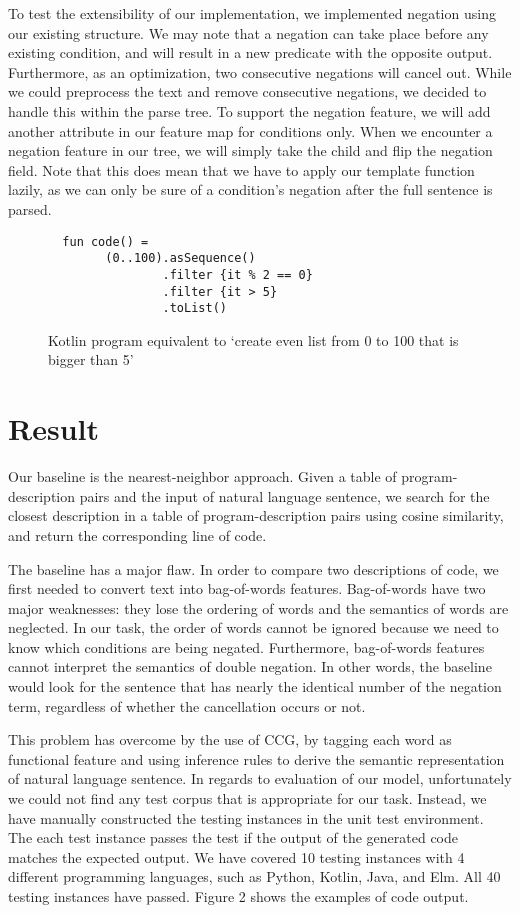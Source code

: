 \documentclass[11pt,letterpaper]{article}
\begin{document}
To test the extensibility of our implementation, we implemented negation using our existing structure.
We may note that a negation can take place before any existing condition, and will result in a new predicate with the opposite output.
Furthermore, as an optimization, two consecutive negations will cancel out. 
While we could preprocess the text and remove consecutive negations, we decided to handle this within the parse tree.
To support the negation feature, we will add another attribute in our feature map for conditions only.
When we encounter a negation feature in our tree, we will simply take the child and flip the negation field.
Note that this does mean that we have to apply our template function lazily, as we can only be sure of a condition's negation after the full sentence is parsed.

\begin{figure}[t!]
  \small
  \begin{verbatim}
  fun code() =
        (0..100).asSequence()
                .filter {it % 2 == 0}
                .filter {it > 5}
                .toList()
  \end{verbatim}
  \caption{Kotlin program equivalent to \lq create even list from 0 to 100 that is bigger than 5'}
\end{figure}

\section{Result}
Our baseline is the nearest-neighbor approach. Given a table of program-description pairs and the input of natural language sentence, we search for the closest description in a table of program-description pairs using cosine similarity, and return the corresponding line of code.

The baseline has a major flaw. In order to compare two descriptions of code, we first needed to convert text into bag-of-words features. Bag-of-words have two major weaknesses: they lose the ordering of words and the semantics of words are neglected. In our task, the order of words cannot be ignored because we need to know which conditions are being negated. Furthermore, bag-of-words features cannot interpret the semantics of double negation. In other words, the baseline would look for the sentence that has nearly the identical number of the negation term, regardless of whether the cancellation occurs or not.

This problem has overcome by the use of CCG, by tagging each word as functional feature and using inference rules to derive the semantic representation of natural language sentence. In regards to evaluation of our model, unfortunately we could not find any test corpus that is appropriate for our task. Instead, we have manually constructed the testing instances in the unit test environment. The each test instance passes the test if the output of the generated code matches the expected output. We have covered 10 testing instances with 4 different programming languages, such as Python, Kotlin, Java, and Elm. All 40 testing instances have passed. Figure 2 shows the examples of code output. 
\end{document}
